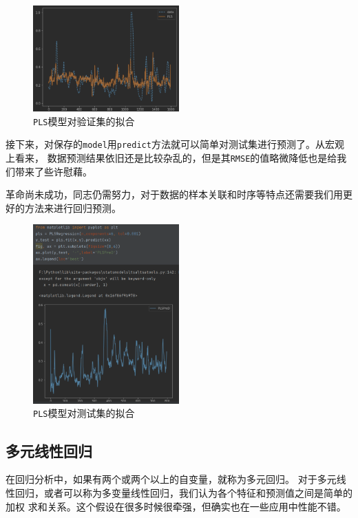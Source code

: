 \documentclass[11pt,a4paper]{elegantpaper}
\begin{document}
\begin{multicols}{2}
\begin{figure}[H]
  \centering
  \includegraphics[width=0.5\textwidth]{images/PPP.png}
  \caption{\lstinline{PLS}模型对验证集的拟合} 
\end{figure}

接下来，对保存的\lstinline{model}用\lstinline{predict}方法就可以简单对测试集进行预测了。从宏观上看来，
数据预测结果依旧还是比较杂乱的，但是其\lstinline{RMSE}的值略微降低也是给我们带来了些许慰藉。

革命尚未成功，同志仍需努力，对于数据的样本关联和时序等特点还需要我们用更好的方法来进行回归预测。

\begin{figure}[H]
  \centering
  \includegraphics[width=0.5\textwidth]{images/PPPP.png}
  \caption{\lstinline{PLS}模型对测试集的拟合} 
\end{figure}

\subsection{多元线性回归}

在回归分析中，如果有两个或两个以上的自变量，就称为多元回归。
对于多元线性回归，或者可以称为多变量线性回归，我们认为各个特征和预测值之间是简单的加权
求和关系。这个假设在很多时候很牵强，但确实也在一些应用中性能不错。


\end{multicols}
\end{document}
